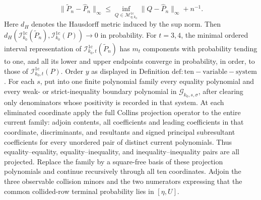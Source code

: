 \[
 \|\widetilde P_n-\widehat P_n\|_\infty
 \leq\inf_{Q\in\mathcal M_{\eta,k_0}^{1\mathrm c}}
 \|Q-\widehat P_n\|_\infty+n^{-1}.
\]
Here \(d_H\) denotes the Hausdorff metric induced by the sup norm.  Then \(d_H(\mathcal I_{k_0}^{1\mathrm c}(\widetilde P_n),\mathcal I_{k_0}^{1\mathrm c}(P))\to0\) in probability.  For \(t=3,4\), the minimal ordered interval representation of \(\mathcal I_{k_0,t}^{1\mathrm c}(\widetilde P_n)\) has \(m_t\) components with probability tending to one, and all its lower and upper endpoints converge in probability, in order, to those of \(\mathcal I_{k_0,t}^{1\mathrm c}(P)\).
Order \(y\) as displayed in Definition \(\mathrm{def:ten-variable-system}\).  For each \(s\), put into one finite polynomial family every equality polynomial and every weak- or strict-inequality boundary polynomial in \(\mathscr G_{k_0,s,\sigma}\), after clearing only denominators whose positivity is recorded in that system.  At each eliminated coordinate apply the full Collins projection operator to the entire current family: adjoin contents, all coefficients and leading coefficients in that coordinate, discriminants, and resultants and signed principal subresultant coefficients for every unordered pair of distinct current polynomials.  Thus equality--equality, equality--inequality, and inequality--inequality pairs are all projected.  Replace the family by a square-free basis of these projection polynomials and continue recursively through all ten coordinates.  Adjoin the three observable collision minors and the two numerators expressing that the common collided-row terminal probability lies in \([\eta,U]\).

